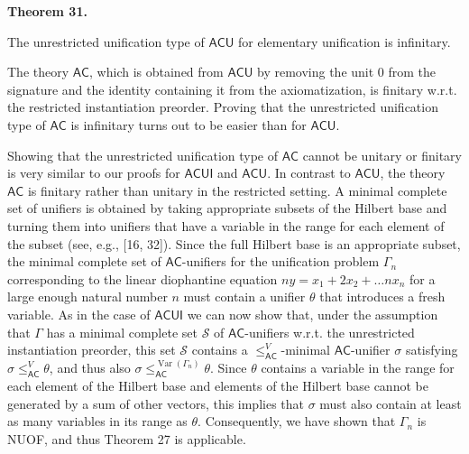  
 
\par\medskip\noindent\textbf{Theorem 31.}\par
 
 
The unrestricted unification type of $\mathsf{ACU}$ for elementary unification is infinitary.\par
 
 
 
 
The theory $\mathsf{AC}$, which is obtained from $\mathsf{ACU}$ by removing the unit $0$ from the signature and the identity containing it from the axiomatization, is finitary w.r.t. the restricted instantiation preorder. Proving that the unrestricted unification type of $\mathsf{AC}$ is infinitary turns out to be easier than for $\mathsf{ACU}$.\par
 
 
 
Showing that the unrestricted unification type of $\mathsf{AC}$ cannot be unitary or finitary is very similar to our proofs for $\mathsf{ACUI}$ and $\mathsf{ACU}$. In contrast to $\mathsf{ACU}$, the theory $\mathsf{AC}$ is finitary rather than unitary in the restricted setting. A minimal complete set of unifiers is obtained by taking appropriate subsets of the Hilbert base and turning them into unifiers that have a variable in the range for each element of the subset (see, e.g., [16, 32]). Since the full Hilbert base is an appropriate subset, the minimal complete set of $\mathsf{AC}$-unifiers for the unification problem $\Gamma_{n}$ corresponding to the linear diophantine equation $ny=x_{1}+2x_{2}+\ldots nx_{n}$ for a large enough natural number $n$ must contain a unifier $\theta$ that introduces a fresh variable. As in the case of $\mathsf{ACUI}$ we can now show that, under the assumption that $\Gamma$ has a minimal complete set $\mathcal{S}$ of $\mathsf{AC}$-unifiers w.r.t. the unrestricted instantiation preorder, this set $\mathcal{S}$ contains a $\leq_{\mathsf{AC}}^{V}$-minimal $\mathsf{AC}$-unifier $\sigma$ satisfying $\sigma\leq_{\mathsf{AC}}^{V}\theta$, and thus also $\sigma\leq_{\mathsf{AC}}^{\operatorname{Var}(\Gamma_{n})}\theta$. Since $\theta$ contains a variable in the range for each element of the Hilbert base and elements of the Hilbert base cannot be generated by a sum of other vectors, this implies that $\sigma$ must also contain at least as many variables in its range as $\theta$. Consequently, we have shown that $\Gamma_{n}$ is NUOF, and thus Theorem 27 is applicable.\par
 
